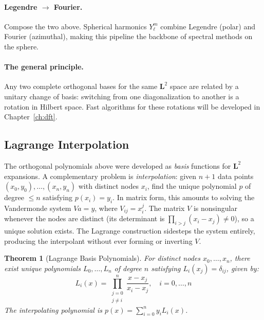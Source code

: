 \documentclass[12pt,a4paper]{report}
\theoremstyle{thms}
\newtheorem{theorem}{Theorem}[section]
\theoremstyle{defns}
\begin{document}
\paragraph{Legendre $\to$ Fourier.} Compose the two above. Spherical harmonics $Y_\ell^m$ combine Legendre (polar) and Fourier (azimuthal), making this pipeline the backbone of spectral methods on the sphere.

\paragraph{The general principle.} Any two complete orthogonal bases for the same $\mathbf{L}^2$ space are related by a unitary change of basis: switching from one diagonalization to another is a rotation in Hilbert space. Fast algorithms for these rotations will be developed in Chapter~\ref{ch:dft}.

\subsection{Lagrange Interpolation}
\label{sec:lagrange}

The orthogonal polynomials above were developed as \textit{basis} functions for $\mathbf{L}^2$ expansions. A complementary problem is \textit{interpolation}: given $n + 1$ data points $(x_0, y_0), \ldots, (x_n, y_n)$ with distinct nodes $x_i$, find the unique polynomial $p$ of degree $\leq n$ satisfying $p(x_i) = y_i$. In matrix form, this amounts to solving the Vandermonde system $Va = y$, where $V_{ij} = x_i^j$. The matrix $V$ is nonsingular whenever the nodes are distinct (its determinant is $\prod_{i > j}(x_i - x_j) \neq 0$), so a unique solution exists. The Lagrange construction sidesteps the system entirely, producing the interpolant without ever forming or inverting $V$.

\begin{theorem}[Lagrange Basis Polynomials]
    \label{thm:lagrange_basis}
    For distinct nodes $x_0, \ldots, x_n$, there exist unique polynomials $L_0, \ldots, L_n$ of degree $n$ satisfying $L_i(x_j) = \delta_{ij}$, given by:
    \begin{equation}
        L_i(x) = \prod_{\substack{j=0 \\ j \neq i}}^{n} \dfrac{x - x_j}{x_i - x_j}, \quad i = 0, \ldots, n
    \end{equation}
    The interpolating polynomial is $p(x) = \sum_{i=0}^{n} y_i L_i(x)$.
\end{theorem}
\end{document}
